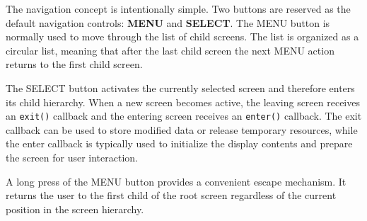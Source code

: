 The navigation concept is intentionally simple. Two buttons are reserved as the
default navigation controls: \textbf{MENU} and \textbf{SELECT}. The MENU button
is normally used to move through the list of child screens. The list is
organized as a circular list, meaning that after the last child screen the next
MENU action returns to the first child screen.

The SELECT button activates the currently selected screen and therefore enters
its child hierarchy. When a new screen becomes active, the leaving screen
receives an \texttt{exit()} callback and the entering screen receives an
\texttt{enter()} callback. The exit callback can be used to store modified data
or release temporary resources, while the enter callback is typically used to
initialize the display contents and prepare the screen for user interaction.

A long press of the MENU button provides a convenient escape mechanism. It
returns the user to the first child of the root screen regardless of the current
position in the screen hierarchy.

